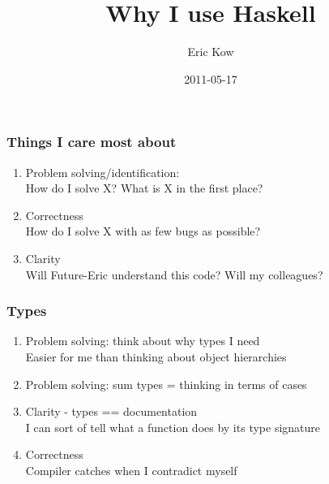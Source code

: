\documentclass[compress]{beamer}
\begin{document}
\title{Why I use Haskell}
\author{Eric Kow}
\date{2011-05-17}

\begin{frame}
\maketitle
\end{frame}

\begin{frame}
\frametitle{Things I care most about}

\begin{enumerate}
\item Problem solving/identification:\\
      \small{How do I solve X?  What is X in the first place?}\\
\item Correctness\\
      \small{How do I solve X with as few bugs as possible?}\\
\item Clarity\\
      \small{Will Future-Eric understand this code? Will my colleagues?}\\
\end{enumerate}

\end{frame}


\begin{frame}
\frametitle{Types}

\begin{enumerate}
\item Problem solving: think about why types I need\\
\small{Easier for me than thinking about object hierarchies}
\item Problem solving: sum types = thinking in terms of cases 
\item Clarity - types == documentation\\
      \small{I can sort of tell what a function does by its type signature}
\item Correctness\\
      \small{Compiler catches when I contradict myself}
\end{enumerate}
\end{frame}
\end{document}
